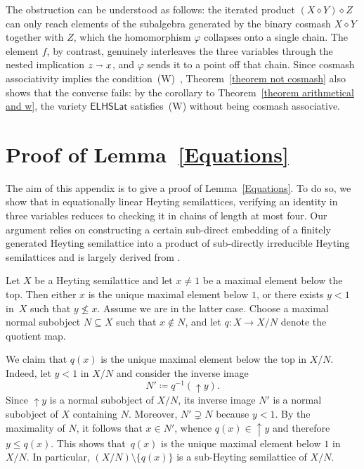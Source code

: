 \documentclass[reqno,a4paper]{amsart}
\theoremstyle{remark}
\theoremstyle{definition}
\newcommand{\ua}{{\uparrow}}
\newcommand{\W}{{\rm (W)}}
\newcommand{\oleq}{\subseteq} %
\newcommand{\iimplies}{\shortrightarrow}
\newcommand{\ELHSLat}{\ensuremath{\mathsf{ELHSLat}}}
\renewcommand{\nleq}{\nleqslant}
\begin{document}
The obstruction can be understood as follows: the iterated product \((X\diamond Y)\diamond Z\) can only reach elements of the subalgebra generated by the binary cosmash \(X\diamond Y\) together with \(Z\), which the homomorphism \(\varphi\) collapses onto a single chain. The element \(f\), by contrast, genuinely interleaves the three variables through the nested implication \(z\iimplies x\), and \(\varphi\) sends it to a point off that chain. Since cosmash associativity implies the condition~\W{}~\cite{CocoThesis}, Theorem~\ref{theorem not cosmash} also shows that the converse fails: by the corollary to Theorem~\ref{theorem arithmetical and w}, the variety \(\ELHSLat\) satisfies~\W{} without being cosmash associative.


\appendix
\section{Proof of Lemma~\ref{Equations}}\label{Appendix}

The aim of this appendix is to give a proof of Lemma~\ref{Equations}. To do so, we show that in equationally linear Heyting semilattices, verifying an identity in three variables reduces to checking it in chains of length at most four. Our argument relies on constructing a certain sub-direct embedding of a finitely generated Heyting semilattice into a product of sub-directly irreducible Heyting semilattices and is largely derived from \cite{FreydHeyting}.

Let \(X\) be a Heyting semilattice and let \(x \neq 1\) be a maximal element below the top. Then either \(x\) is the unique maximal element below \(1\), or there exists \(y < 1\) in~\(X\)  such that \(y \nleq x\). Assume we are in the latter case. Choose a maximal normal subobject \(N \oleq X\) such that \(x \notin N\), and let \(q \colon X \to X/N\) denote the quotient map.

We claim that \(q(x)\) is the unique maximal element below the top in \(X/N\). Indeed, let \(y < 1\) in \(X/N\) and consider the inverse image
\[
	N' \coloneq q^{-1}(\ua{y}).
\]
Since \(\ua{y}\) is a normal subobject of \(X/N\), its inverse image \(N'\) is a normal subobject of \(X\) containing \(N\). Moreover, \(N' \supsetneq N\) because \(y < 1\). By the maximality of \(N\), it follows that \(x \in N'\), whence \(q(x) \in \ua{y}\) and therefore \(y \le q(x)\). This shows that~\(q(x)\) is the unique maximal element below \(1\) in \(X/N\). In particular, \((X/N) \setminus \{q(x)\}\) is a sub-Heyting semilattice of \(X/N\).
\end{document}
